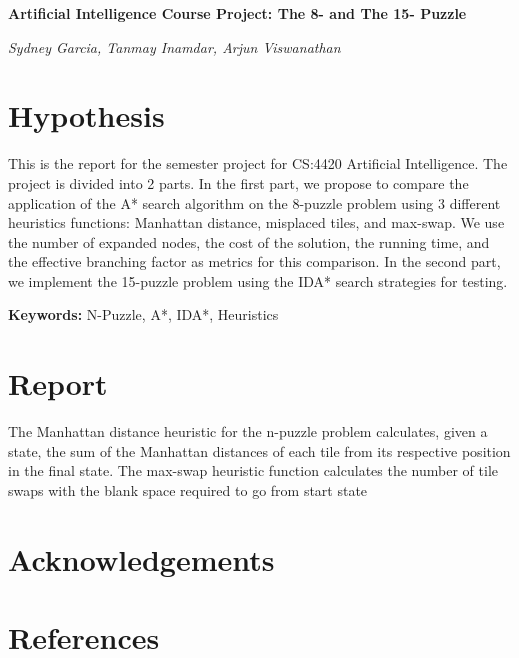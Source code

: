 \documentclass{article}
\begin{document}
	\begin{center}
		\Large \textbf{Artificial Intelligence Course Project: The 8- and The 15- Puzzle}
	\end{center}
	\begin{center}
		\textit{Sydney Garcia, Tanmay Inamdar, Arjun Viswanathan}
	\end{center}

	\section{Hypothesis}
		This is the report for the semester project for CS:4420 Artificial Intelligence. The project is divided into 2 parts. In the first part, we propose to compare the application of the A* search algorithm on the 8-puzzle problem using 3 different heuristics functions: Manhattan distance, misplaced tiles, and max-swap. We use the number of expanded nodes, the cost of the solution, the running time, and the effective branching factor as metrics for this comparison. In the second part, we implement the 15-puzzle problem using the IDA* search strategies for testing. \par 
		
		\textbf{Keywords: } N-Puzzle, A*, IDA*, Heuristics
		
	\section{Report}
		
		The Manhattan distance heuristic for the n-puzzle problem calculates, given a state, the sum of the Manhattan distances of each tile from its respective position in the final state. The max-swap heuristic function calculates the number of tile swaps with the blank space required to go from start state 
	\section{Acknowledgements}
	
	\section{References}
\end{document}
